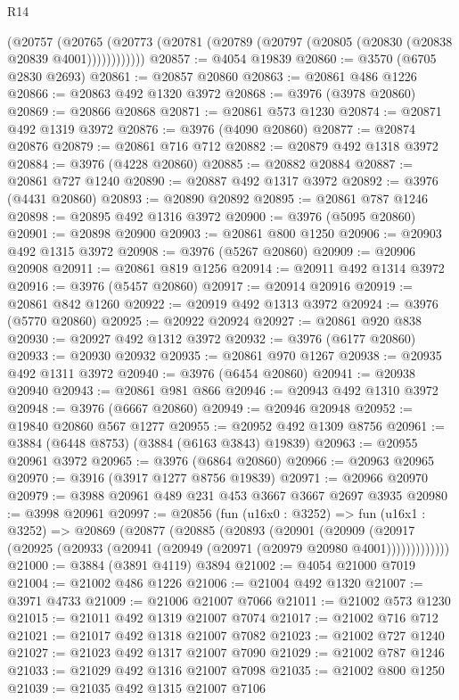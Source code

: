 \begin{lexlean}{R14}
\begin{coremodule}
          (@20757
            (@20765 (@20773 (@20781 (@20789 (@20797 (@20805 (@20830 (@20838 @20839 @4001))))))))))))
@20857 := @4054 @19839
@20860 := @3570 (@6705 @2830 @2693)
@20861 := @20857 @20860
@20863 := @20861 @486 @1226
@20866 := @20863 @492 @1320 @3972
@20868 := @3976 (@3978 @20860)
@20869 := @20866 @20868
@20871 := @20861 @573 @1230
@20874 := @20871 @492 @1319 @3972
@20876 := @3976 (@4090 @20860)
@20877 := @20874 @20876
@20879 := @20861 @716 @712
@20882 := @20879 @492 @1318 @3972
@20884 := @3976 (@4228 @20860)
@20885 := @20882 @20884
@20887 := @20861 @727 @1240
@20890 := @20887 @492 @1317 @3972
@20892 := @3976 (@4431 @20860)
@20893 := @20890 @20892
@20895 := @20861 @787 @1246
@20898 := @20895 @492 @1316 @3972
@20900 := @3976 (@5095 @20860)
@20901 := @20898 @20900
@20903 := @20861 @800 @1250
@20906 := @20903 @492 @1315 @3972
@20908 := @3976 (@5267 @20860)
@20909 := @20906 @20908
@20911 := @20861 @819 @1256
@20914 := @20911 @492 @1314 @3972
@20916 := @3976 (@5457 @20860)
@20917 := @20914 @20916
@20919 := @20861 @842 @1260
@20922 := @20919 @492 @1313 @3972
@20924 := @3976 (@5770 @20860)
@20925 := @20922 @20924
@20927 := @20861 @920 @838
@20930 := @20927 @492 @1312 @3972
@20932 := @3976 (@6177 @20860)
@20933 := @20930 @20932
@20935 := @20861 @970 @1267
@20938 := @20935 @492 @1311 @3972
@20940 := @3976 (@6454 @20860)
@20941 := @20938 @20940
@20943 := @20861 @981 @866
@20946 := @20943 @492 @1310 @3972
@20948 := @3976 (@6667 @20860)
@20949 := @20946 @20948
@20952 := @19840 @20860 @567 @1277
@20955 := @20952 @492 @1309 @8756
@20961 := @3884 (@6448 @8753) (@3884 (@6163 @3843) @19839)
@20963 := @20955 @20961 @3972
@20965 := @3976 (@6864 @20860)
@20966 := @20963 @20965
@20970 := @3916 (@3917 @1277 @8756 @19839)
@20971 := @20966 @20970
@20979 := @3988 @20961 @489 @231 @453 @3667 @3667 @2697 @3935
@20980 := @3998 @20961
@20997 := @20856
    (fun (u16x0 : @3252) =>
    fun (u16x1 : @3252) =>
    @20869
      (@20877
        (@20885
          (@20893
            (@20901
              (@20909
                (@20917 (@20925 (@20933 (@20941 (@20949 (@20971 (@20979 @20980 @4001)))))))))))))
@21000 := @3884 (@3891 @4119) @3894
@21002 := @4054 @21000 @7019
@21004 := @21002 @486 @1226
@21006 := @21004 @492 @1320
@21007 := @3971 @4733
@21009 := @21006 @21007 @7066
@21011 := @21002 @573 @1230
@21015 := @21011 @492 @1319 @21007 @7074
@21017 := @21002 @716 @712
@21021 := @21017 @492 @1318 @21007 @7082
@21023 := @21002 @727 @1240
@21027 := @21023 @492 @1317 @21007 @7090
@21029 := @21002 @787 @1246
@21033 := @21029 @492 @1316 @21007 @7098
@21035 := @21002 @800 @1250
@21039 := @21035 @492 @1315 @21007 @7106

\end{coremodule}
\end{lexlean}
